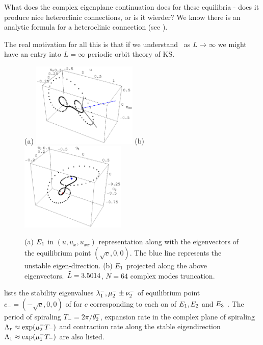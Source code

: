 What does the complex eigenplane continuation does for these
equilibria - does it produce nice heteroclinic connections, or is it
wierder? We know there is an analytic formula for a heteroclinic
connection (see ). %

The real motivation for all this is that if we understand \eqva\ as
$L \to \infty$ we might have an entry into $L = \infty$ periodic orbit
theory of KS.

\begin{figure}[h]
\centering
(a) \includegraphics[width=5.0cm]{figs/1wSteadyE.eps}
\hspace{0.1in}
(b) \includegraphics[width=5.0cm]{figs/1wSteadyP.eps}
\caption{
\small{
(a) $\EQV{1}$ in $(u,u_x,u_{xx})$ representation along with the eigenvectors of the equilibrium
point $(\sqrt{c},0,0)$. The blue line represents the unstable eigen-direction.
(b) $\EQV{1}$ projected along the above eigenvectors. $\tildeL=3.5014$, $N=64$ complex modes truncation.
}
}
\label{f:1wSteady}
\end{figure}

 lists the stability eigenvalues
$\eigExp[1]^-,\eigRe[2]^-\pm\eigIm[2]^-$
of equilibrium point $c_{-}=(-\sqrt{c},0,0)$
of  for $c$ corresponding to each on of $\EQV{1},\EQV{2}$ and $\EQV{3}$ \eqva.
The period of spiraling $T_{-}=2\pi/\theta^-_2$, expansion
rate in the complex plane of spiraling
$\ExpaEig_r\approx\exp(\eigRe[2]^- T_-)$ and contraction
rate along the stable eigendirection
$\ExpaEig_1\approx\exp(\eigRe[1]^- T_-)$ are also listed.

